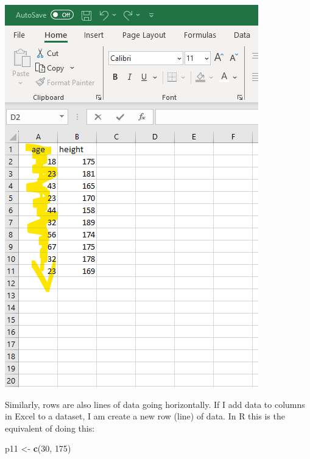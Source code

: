 \documentclass[
]{book}
\newenvironment{Shaded}{\begin{snugshade}}{\end{snugshade}}
\newcommand{\DecValTok}[1]{\textcolor[rgb]{0.00,0.00,0.81}{#1}}
\newcommand{\FunctionTok}[1]{\textcolor[rgb]{0.13,0.29,0.53}{\textbf{#1}}}
\newcommand{\NormalTok}[1]{#1}
\newcommand{\OtherTok}[1]{\textcolor[rgb]{0.56,0.35,0.01}{#1}}
\begin{document}
\includegraphics{img/03-column-vector.png}

Similarly, rows are also lines of data going horizontally. If I add data to columns in Excel to a dataset, I am create a new row (line) of data. In R this is the equivalent of doing this:

\begin{Shaded}
\begin{Highlighting}[]
\NormalTok{p11 }\OtherTok{\textless{}{-}} \FunctionTok{c}\NormalTok{(}\DecValTok{30}\NormalTok{, }\DecValTok{175}\NormalTok{)}
\end{Highlighting}
\end{Shaded}
\end{document}
